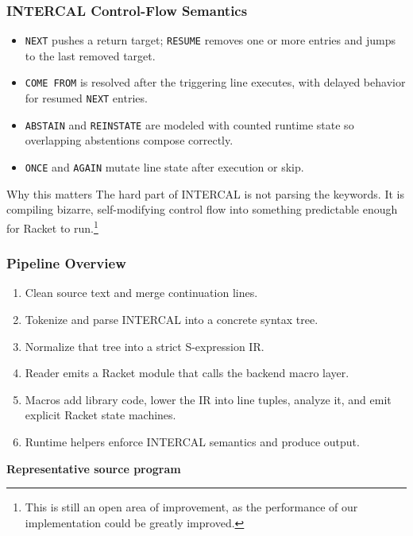 \documentclass{beamer}
\begin{document}
\begin{frame}[fragile]
  \frametitle{INTERCAL Control-Flow Semantics}

  \begin{itemize}
    \item \texttt{NEXT} pushes a return target; \texttt{RESUME} removes one or more entries and jumps to the last removed target.
    \item \texttt{COME FROM} is resolved after the triggering line executes, with delayed behavior for resumed \texttt{NEXT} entries.
    \item \texttt{ABSTAIN} and \texttt{REINSTATE} are modeled with counted runtime state so overlapping abstentions compose correctly.
    \item \texttt{ONCE} and \texttt{AGAIN} mutate line state after execution or skip.
  \end{itemize}

  \vspace{0.2cm}
  \begin{block}{Why this matters}
    The hard part of INTERCAL is not parsing the keywords. It is compiling bizarre, self-modifying control flow into something predictable enough for Racket to run.\footnote{This is still an open area of improvement, as the performance of our implementation could be greatly improved.}
  \end{block}
\end{frame}



\begin{frame}[fragile]
  \frametitle{Pipeline Overview}

  \begin{enumerate}
    \item Clean source text and merge continuation lines.
    \item Tokenize and parse INTERCAL into a concrete syntax tree.
    \item Normalize that tree into a strict S-expression IR.
    \item Reader emits a Racket module that calls the backend macro layer.
    \item Macros add library code, lower the IR into line tuples, analyze it, and emit explicit Racket state machines.
    \item Runtime helpers enforce INTERCAL semantics and produce output.
  \end{enumerate}

  \vspace{0.2cm}
  \textbf{Representative source program}

  
\end{frame}
\end{document}
